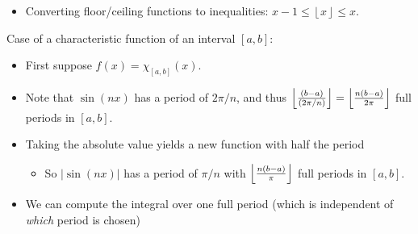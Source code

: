 \begin{solution}

\envlist

\begin{concept}

\envlist

\begin{itemize}
\tightlist
\item
  Converting floor/ceiling functions to inequalities:
  \(x-1 \leq {\left\lfloor x \right\rfloor} \leq x\).
\end{itemize}

\end{concept}

Case of a characteristic function of an interval \([a, b]\):

\begin{itemize}
\item
  First suppose \(f(x) = \chi_{[a, b]}(x)\).
\item
  Note that \(\sin(nx)\) has a period of \(2\pi/n\), and thus
  \({\left\lfloor (b-a) \over (2\pi / n) \right\rfloor} = {\left\lfloor n(b-a)\over 2\pi \right\rfloor}\)
  full periods in \([a, b]\).
\item
  Taking the absolute value yields a new function with half the period

  \begin{itemize}
  \tightlist
  \item
    So \({\left\lvert {\sin(nx)} \right\rvert}\) has a period of
    \(\pi/n\) with \({\left\lfloor n(b-a) \over \pi \right\rfloor}\)
    full periods in \([a, b]\).
  \end{itemize}
\item
  We can compute the integral over one full period (which is independent
  of \emph{which} period is chosen)


\end{itemize}
\end{solution}
